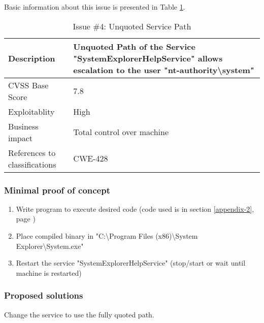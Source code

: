 Basic information about this issue is presented in Table \ref{tbl:issue-4}.
\begin{table}[h]
	\centering
	\begin{tabular}{| l | p{10cm} |}
		\hline
		Description & Unquoted Path of the Service "SystemExplorerHelpService" allows escalation to the user "nt-authority\textbackslash system" \\
		\hline
		CVSS Base Score & 7.8 \\
		\hline
		Exploitablity & High \\
		\hline
		Business impact & Total control over machine \\
		\hline
		References to classifications & CWE-428 \\
		\hline
	\end{tabular}
	\caption{Issue \#4: Unquoted Service Path}
	\label{tbl:issue-4}
\end{table}

\subsubsection{Minimal proof of concept}
\begin{enumerate}
  \item Write program to execute desired code (code used is in section \ref{appendix-2}, page \pageref{appendix-2})
  \item Place compiled binary in "C:\textbackslash Program Files (x86)\textbackslash System Explorer\textbackslash System.exe"
  \item Restart the service "SystemExplorerHelpService" (stop/start or wait until machine is restarted)
\end{enumerate}

\subsubsection{Proposed solutions} \label{solution:issue-4}
Change the service to use the fully quoted path.
